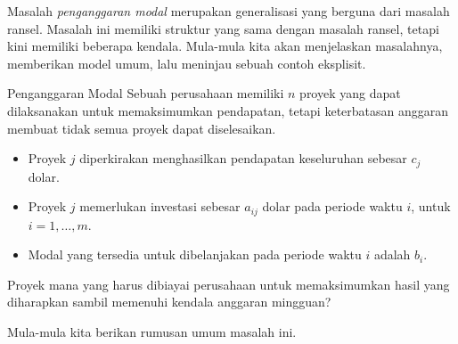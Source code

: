 
Masalah \emph{penganggaran modal} merupakan generalisasi yang berguna dari masalah ransel. Masalah ini memiliki struktur yang sama dengan masalah ransel, tetapi kini memiliki beberapa kendala. Mula-mula kita akan menjelaskan masalahnya, memberikan model umum, lalu meninjau sebuah contoh eksplisit.

\begin{general}{Penganggaran Modal}{}
\label{general:capital-budgeting}
Sebuah perusahaan memiliki $n$ proyek yang dapat dilaksanakan untuk memaksimumkan pendapatan, tetapi keterbatasan anggaran membuat tidak semua proyek dapat diselesaikan.
\begin{itemize}
\item Proyek $j$ diperkirakan menghasilkan pendapatan keseluruhan sebesar $c_j$ dolar.
\item Proyek $j$ memerlukan investasi sebesar $a_{ij}$ dolar pada periode waktu $i$, untuk $i = 1,\ldots,m$.
\item Modal yang tersedia untuk dibelanjakan pada periode waktu $i$ adalah $b_i$.
\end{itemize}
Proyek mana yang harus dibiayai perusahaan untuk memaksimumkan hasil yang diharapkan sambil memenuhi kendala anggaran mingguan?
\end{general}

\newpage

Mula-mula kita berikan rumusan umum masalah ini.

